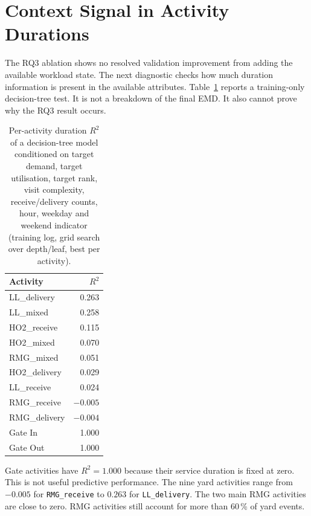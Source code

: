 \section{Context Signal in Activity Durations}
\label{sec:results_per_activity}

The RQ3 ablation shows no resolved validation improvement from adding the
available workload state. The next diagnostic
checks how much duration information is present in the
available attributes. Table~\ref{tab:tree_r2_train_test} reports a
training-only decision-tree test. It is not a breakdown of the final EMD. It
also cannot prove why the RQ3 result occurs.

\begin{table}[htbp]
\centering
\begin{tabular}{lr}
\toprule
\textbf{Activity} & \textbf{$R^{2}$} \\
\midrule
LL\_delivery  & 0.263 \\
LL\_mixed     & 0.258 \\
HO2\_receive  & 0.115 \\
HO2\_mixed    & 0.070 \\
RMG\_mixed    & 0.051 \\
HO2\_delivery & 0.029 \\
LL\_receive   & 0.024 \\
RMG\_receive  & $-0.005$ \\
RMG\_delivery & $-0.004$ \\
Gate In       & 1.000 \\
Gate Out      & 1.000 \\
\bottomrule
\end{tabular}
\caption{Per-activity duration $R^{2}$ of a decision-tree model
conditioned on target demand, target utilisation, target rank, visit
complexity, receive/delivery counts, hour, weekday and weekend
indicator (training log, grid search over depth/leaf, best per
activity).}
\label{tab:tree_r2_train_test}
\end{table}

Gate activities have $R^{2}=1.000$ because their service duration is fixed at
zero. This is not useful predictive performance. The nine yard activities
range from $-0.005$ for \texttt{RMG\_receive} to $0.263$ for
\texttt{LL\_delivery}. The two main RMG activities are close to zero. RMG
activities still account for more than 60\,\% of yard events.

